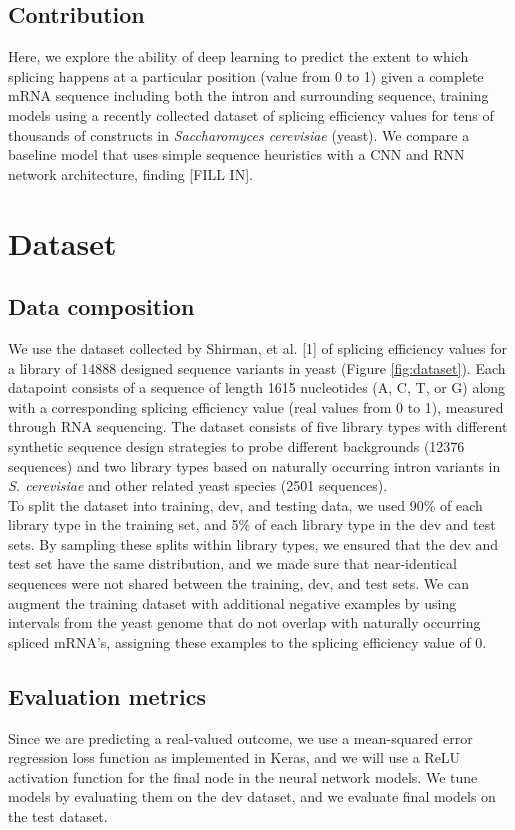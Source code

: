 \documentclass[10.5pt]{article}
\begin{document}
\subsection{Contribution}
Here, we explore the ability of deep learning to predict the extent to which splicing happens at a particular position (value from 0 to 1) given a complete mRNA sequence including both the intron and surrounding sequence, training models using a recently collected dataset of splicing efficiency values for tens of thousands of constructs in {\it Saccharomyces cerevisiae} (yeast). We compare a baseline model that uses simple sequence heuristics with a CNN and RNN network architecture, finding [FILL IN].
\section{Dataset}
\subsection{Data composition}
We use the dataset collected by Shirman, et al. [1] of splicing efficiency values for a library of 14888 designed sequence variants in yeast (Figure \ref{fig:dataset}). Each datapoint consists of a sequence of length 1615 nucleotides (A, C, T, or G) along with a corresponding splicing efficiency value (real values from 0 to 1), measured through RNA sequencing. The dataset consists of five library types with different synthetic sequence design strategies to probe different backgrounds (12376 sequences) and two library types based on naturally occurring intron variants in {\it S. cerevisiae} and other related yeast species (2501 sequences). 
\newline \\
To split the dataset into training, dev, and testing data, we used 90\% of each library type in the training set, and 5\% of each library type in the dev and test sets. By sampling these splits within library types, we ensured that the dev and test set have the same distribution, and we made sure that near-identical sequences were not shared between the training, dev, and test sets. We can augment the training dataset with additional negative examples by using intervals from the yeast genome that do not overlap with naturally occurring spliced mRNA's, assigning these examples to the splicing efficiency value of 0. 
\subsection{Evaluation metrics}
Since we are predicting a real-valued outcome, we use a mean-squared error regression loss function as implemented in Keras, and we will use a ReLU activation function for the final node in the neural network models. We tune models by evaluating them on the dev dataset, and we evaluate final models on the test dataset.
\end{document}
